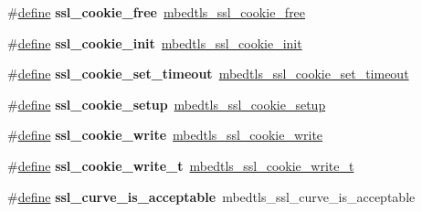 \begin{DoxyCompactItemize}
\item 
\mbox{\label{compat-1_83_8h_a2d06826db19ddd37a6bd0a0bd82ed13f}} 
\#\hyperlink{structdefine}{define} {\bfseries ssl\+\_\+cookie\+\_\+free}~\hyperlink{ssl__cookie_8h_a77d57052186940783e056f5ca95bda03}{mbedtls\+\_\+ssl\+\_\+cookie\+\_\+free}
\item 
\mbox{\label{compat-1_83_8h_ac4bcc8d4e19040a3eb3ee1da6e69b802}} 
\#\hyperlink{structdefine}{define} {\bfseries ssl\+\_\+cookie\+\_\+init}~\hyperlink{ssl__cookie_8h_affed42a7313e08576aad621f25d5c4f3}{mbedtls\+\_\+ssl\+\_\+cookie\+\_\+init}
\item 
\mbox{\label{compat-1_83_8h_a60383c1e039e990397c8465c69189ebf}} 
\#\hyperlink{structdefine}{define} {\bfseries ssl\+\_\+cookie\+\_\+set\+\_\+timeout}~\hyperlink{ssl__cookie_8h_a5ae5d375a80fbe6f6f1b219c1b1dc8bb}{mbedtls\+\_\+ssl\+\_\+cookie\+\_\+set\+\_\+timeout}
\item 
\mbox{\label{compat-1_83_8h_a0c79bee4e6ca637cc5f9d1708e0d9311}} 
\#\hyperlink{structdefine}{define} {\bfseries ssl\+\_\+cookie\+\_\+setup}~\hyperlink{ssl__cookie_8h_ac81843a6bd31b31765639b65329d6b69}{mbedtls\+\_\+ssl\+\_\+cookie\+\_\+setup}
\item 
\mbox{\label{compat-1_83_8h_a31b716bfeb5ca26773c5a5e6a0818a2a}} 
\#\hyperlink{structdefine}{define} {\bfseries ssl\+\_\+cookie\+\_\+write}~\hyperlink{ssl__cookie_8h_a132e60f12cd3465264d283042cabe6d2}{mbedtls\+\_\+ssl\+\_\+cookie\+\_\+write}
\item 
\mbox{\label{compat-1_83_8h_af0340810396607f7b5ba9396565c1167}} 
\#\hyperlink{structdefine}{define} {\bfseries ssl\+\_\+cookie\+\_\+write\+\_\+t}~\hyperlink{ssl_8h_a536f8b89936f26732150b00639a47ff0}{mbedtls\+\_\+ssl\+\_\+cookie\+\_\+write\+\_\+t}
\item 
\mbox{\label{compat-1_83_8h_a665c00313bd3533315ce2cb80be2bf53}} 
\#\hyperlink{structdefine}{define} {\bfseries ssl\+\_\+curve\+\_\+is\+\_\+acceptable}~mbedtls\+\_\+ssl\+\_\+curve\+\_\+is\+\_\+acceptable
\item 
\mbox{\label{compat-1_83_8h_a8867f0ae1ed64021b7158709e1dc78d6}} 

\end{DoxyCompactItemize}
